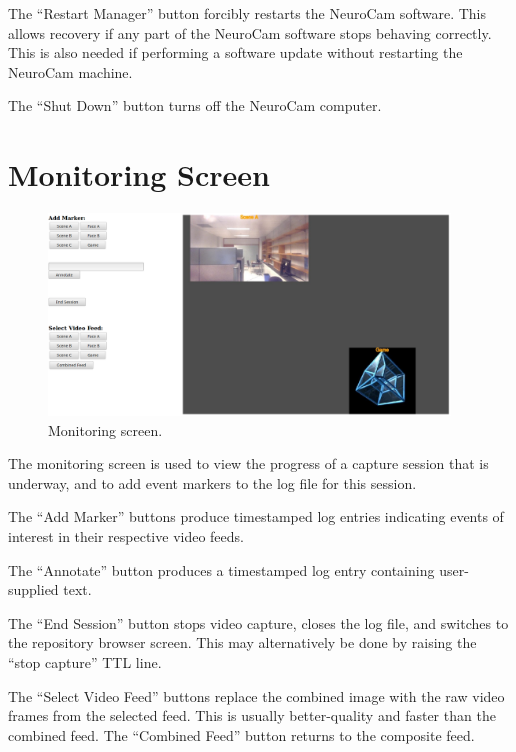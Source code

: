 The ``Restart Manager'' button forcibly restarts the NeuroCam software. This
allows recovery if any part of the NeuroCam software stops behaving correctly.
This is also needed if performing a software update without restarting the
NeuroCam machine.

The ``Shut Down'' button turns off the NeuroCam computer.

\section{Monitoring Screen}
\label{gui-monitor}

\begin{figure}[h]
\begin{center}
\includegraphics[width=0.95\textwidth]{pics-gui/gui-monitor.png}
\end{center}
\caption{Monitoring screen.}\label{fig-gui-monitor}
\end{figure}


The monitoring screen is used to view the progress of a capture session that
is underway, and to add event markers to the log file for this session.

The ``Add Marker'' buttons produce timestamped log entries indicating
events of interest in their respective video feeds.

The ``Annotate'' button produces a timestamped log entry containing
user-supplied text.

The ``End Session'' button stops video capture, closes the log file, and
switches to the repository browser screen. This may alternatively be done
by raising the ``stop capture'' TTL line.

The ``Select Video Feed'' buttons replace the combined image with the raw
video frames from the selected feed. This is usually better-quality and 
faster than the combined feed. The ``Combined Feed'' button returns to the
composite feed.

